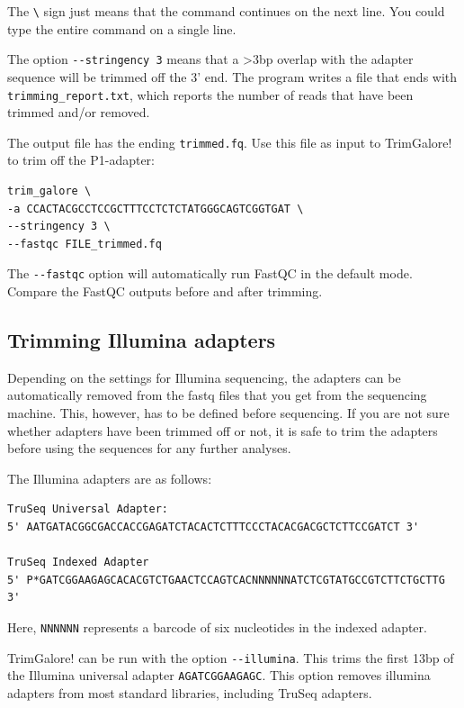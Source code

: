 \documentclass[11pt]{article}
\begin{document}
The \texttt{\textbackslash{}} sign just means that the command continues on the next
line. You could type the entire command on a single line.


The option \texttt{-{}-stringency 3} means that a >3bp overlap with the adapter
sequence will be trimmed off the 3' end. The program writes a file
that ends with \texttt{trimming\_report.txt}, which reports the number of
reads that have been trimmed and/or removed.

The output file has the ending \texttt{trimmed.fq}. Use this file as
input to TrimGalore! to trim off the P1-adapter:

\begin{verbatim}
trim_galore \
-a CCACTACGCCTCCGCTTTCCTCTCTATGGGCAGTCGGTGAT \
--stringency 3 \
--fastqc FILE_trimmed.fq
\end{verbatim}

The \texttt{-{}-fastqc} option will automatically run FastQC in the default
mode. Compare the FastQC outputs before and after trimming.


\clearpage

\subsection{Trimming Illumina adapters}
\label{sec-3-2}
Depending on the settings for Illumina sequencing, the adapters can be
automatically removed from the fastq files that you get from the
sequencing machine. This, however, has to be defined before
sequencing. If you are not sure whether adapters have been trimmed off
or not, it is safe to trim the adapters before using the sequences for
any further analyses.

The Illumina adapters are as follows:

\begin{verbatim}
TruSeq Universal Adapter:
5' AATGATACGGCGACCACCGAGATCTACACTCTTTCCCTACACGACGCTCTTCCGATCT 3'

TruSeq Indexed Adapter
5' P*GATCGGAAGAGCACACGTCTGAACTCCAGTCACNNNNNNATCTCGTATGCCGTCTTCTGCTTG 3'
\end{verbatim}

Here, \texttt{NNNNNN} represents a barcode of six nucleotides in the indexed adapter.

TrimGalore! can be run with the option \texttt{-{}-illumina}. This trims the
first 13bp of the Illumina universal adapter \texttt{AGATCGGAAGAGC}. This
option removes illumina adapters from most standard libraries,
including TruSeq adapters.
\end{document}
